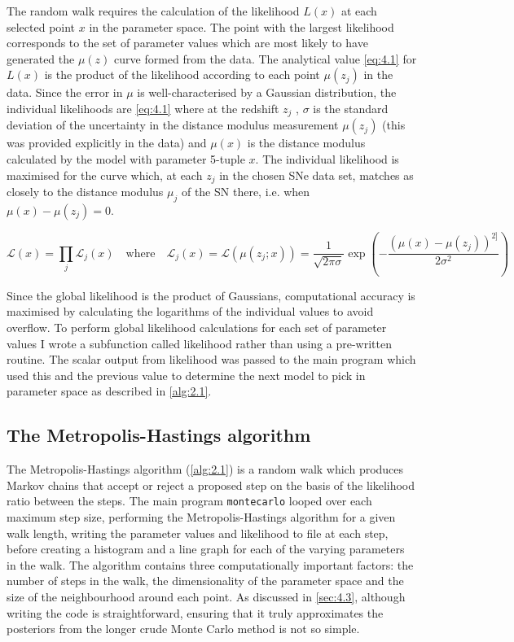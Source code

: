 The random walk requires the calculation of the likelihood $L(x)$ at each selected point $x$ in the parameter space. The point with the largest likelihood corresponds to the set of parameter values which are most likely to have generated the $\mu(z)$ curve formed from the data.   The analytical value \cref{eq:4.1} for $L(x)$ is the product of the likelihood according to each point $\mu(z_j)$ in the data. Since the error in $\mu$ is well-characterised by a Gaussian distribution, the individual likelihoods are \cref{eq:4.1} where at the redshift $z_j$ , $\sigma$ is the standard deviation of the uncertainty in the distance modulus measurement $\mu(z_j)$ (this was provided explicitly in the data) and $\mu(x)$ is the distance modulus calculated by the model with parameter 5-tuple $x$. The individual likelihood is maximised for the curve which, at each $z_j$ in the chosen SNe data set, matches as closely to the distance modulus $\mu_j$ of the SN there, i.e. when $\mu(x) - \mu(z_j) = 0$.

\begin{equation}
    \mathcal{L}(x)
    = \prod_{j} \mathcal{L}_{j}(x)
    \quad
    \text{where}
    \quad
    \mathcal{L}_{j}(x)
    = \mathcal{L} \left( \mu{} ( z_{j};x ) \right)
    = \frac{1}{\sqrt{2\pi{}\sigma{}}} \exp 
    \left( 
        - \frac{\left( \mu{} (x) - \mu{} (z_{j}) \right)^{2]}}{2 \sigma{}^{2} }
    \right)
\label{eq:4.1}
\end{equation}

Since the global likelihood is the product of Gaussians, computational accuracy is maximised by calculating the logarithms of the individual values to avoid overflow. To perform global likelihood calculations for each set of parameter values I wrote a subfunction called likelihood rather than using a pre-written \matlab{} routine. The scalar output from likelihood was passed to the main program which used this and the previous value to determine the next model to pick in parameter space as described in \cref{alg:2.1}.

\subsection{The Metropolis-Hastings algorithm}
\label{sec:4.1.3}

The Metropolis-Hastings algorithm (\cref{alg:2.1}) is a random walk which produces Markov chains that accept or reject a proposed step on the basis of the likelihood ratio between the steps. The main program \texttt{montecarlo} looped over each maximum step size, performing the Metropolis-Hastings algorithm for a given walk length, writing the parameter values and likelihood to file at each step, before creating a histogram and a line graph for each of the varying parameters in the walk. The algorithm contains three computationally important factors: the number of steps in the walk, the dimensionality of the parameter space and the size of the neighbourhood around each point. As discussed in \cref{sec:4.3}, although writing the code is straightforward, ensuring that it truly approximates the posteriors from the longer crude Monte Carlo method is not so simple.
